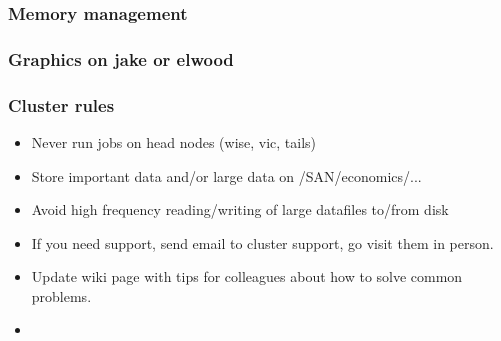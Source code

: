 \documentclass{beamer}
\begin{document}
\begin{frame}
\frametitle{Memory management}
\end{frame}

\begin{frame}
\frametitle{Graphics on jake or elwood}

\end{frame}

\begin{frame}
\frametitle{Cluster rules}
\begin{itemize}
\item Never run jobs on head nodes (wise, vic, tails)
\item Store important data and/or large data on /SAN/economics/...
\item Avoid high frequency reading/writing of large datafiles to/from disk
\item If you need support, send email to cluster support, go visit them in person.
\item Update wiki page with tips for colleagues about how to solve common problems.
\item 
\end{itemize}
\end{frame}
\end{document}
